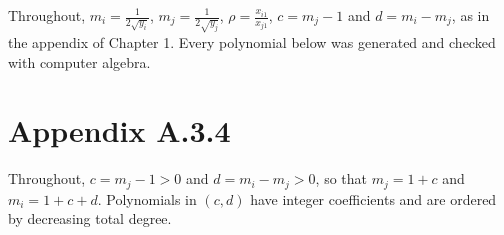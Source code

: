 \allowdisplaybreaks
Throughout, $m_i=\frac{1}{2\sqrt{y_i}}$, $m_j=\frac{1}{2\sqrt{y_j}}$, $\rho=\frac{x_{i1}}{x_{j1}}$, $c=m_j-1$ and $d=m_i-m_j$, as in the appendix of Chapter 1. Every polynomial below was generated and checked with computer algebra.

\section*{Appendix A.3.4}
Throughout, $c=m_j-1>0$ and $d=m_i-m_j>0$, so that $m_j=1+c$ and $m_i=1+c+d$. Polynomials in $(c,d)$ have integer coefficients and are ordered by decreasing total degree.

